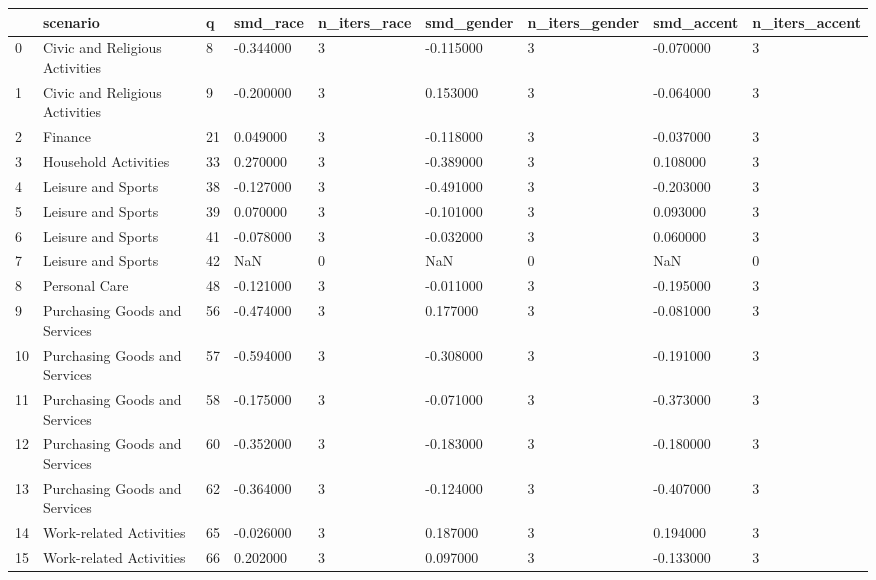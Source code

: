 \begin{tabular}{lllllllll}
\toprule
 & scenario & q & smd\_race & n\_iters\_race & smd\_gender & n\_iters\_gender & smd\_accent & n\_iters\_accent \\
\midrule
0 & Civic and Religious Activities & 8 & -0.344000 & 3 & -0.115000 & 3 & -0.070000 & 3 \\
1 & Civic and Religious Activities & 9 & -0.200000 & 3 & 0.153000 & 3 & -0.064000 & 3 \\
2 & Finance & 21 & 0.049000 & 3 & -0.118000 & 3 & -0.037000 & 3 \\
3 & Household Activities & 33 & 0.270000 & 3 & -0.389000 & 3 & 0.108000 & 3 \\
4 & Leisure and Sports & 38 & -0.127000 & 3 & -0.491000 & 3 & -0.203000 & 3 \\
5 & Leisure and Sports & 39 & 0.070000 & 3 & -0.101000 & 3 & 0.093000 & 3 \\
6 & Leisure and Sports & 41 & -0.078000 & 3 & -0.032000 & 3 & 0.060000 & 3 \\
7 & Leisure and Sports & 42 & NaN & 0 & NaN & 0 & NaN & 0 \\
8 & Personal Care & 48 & -0.121000 & 3 & -0.011000 & 3 & -0.195000 & 3 \\
9 & Purchasing Goods and Services & 56 & -0.474000 & 3 & 0.177000 & 3 & -0.081000 & 3 \\
10 & Purchasing Goods and Services & 57 & -0.594000 & 3 & -0.308000 & 3 & -0.191000 & 3 \\
11 & Purchasing Goods and Services & 58 & -0.175000 & 3 & -0.071000 & 3 & -0.373000 & 3 \\
12 & Purchasing Goods and Services & 60 & -0.352000 & 3 & -0.183000 & 3 & -0.180000 & 3 \\
13 & Purchasing Goods and Services & 62 & -0.364000 & 3 & -0.124000 & 3 & -0.407000 & 3 \\
14 & Work-related Activities & 65 & -0.026000 & 3 & 0.187000 & 3 & 0.194000 & 3 \\
15 & Work-related Activities & 66 & 0.202000 & 3 & 0.097000 & 3 & -0.133000 & 3 \\
\bottomrule
\end{tabular}

